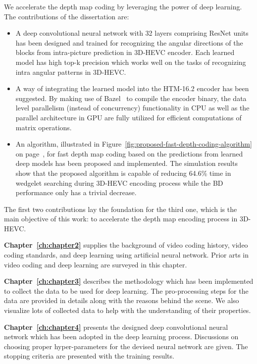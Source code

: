 We accelerate the depth map coding by leveraging the power of
deep learning.
The contributions of the dissertation are:
\begin{itemize}
  \item A deep convolutional neural network with 32 layers comprising ResNet
  units~\parencite{RN67} has been designed and trained for recognizing the
  angular directions of the blocks from intra-picture prediction in 3D-HEVC
  encoder.
  Each learned model has high top-k precision which works well on the
  tasks of recognizing intra angular patterns in 3D-HEVC\@.
  \item A way of integrating the learned model into the HTM-16.2 encoder has
  been suggested.
  By making use of Bazel~\parencite{RN200} to compile the encoder binary, the
  data level parallelism (instead of concurrency) functionality in CPU
  as well as the parallel architecture in GPU are fully utilized for
  efficient computations of matrix operations.
  \item An algorithm, illustrated in
  Figure~\ref{fig:proposed-fast-depth-coding-algorithm}
  on page~\pageref{fig:proposed-fast-depth-coding-algorithm}, for fast
  depth map coding based
  on the predictions from
  learned deep models has been proposed and implemented.
  The simulation results show that the proposed algorithm is capable of
  reducing 64.6\% time in wedgelet searching during 3D-HEVC encoding process
  while the BD performance only has a trivial decrease.
\end{itemize}
The first two contributions lay the foundation for the third one, which is the
main objective of this work: to accelerate the depth map encoding process in
3D-HEVC\@.

\textbf{Chapter~\ref{ch:chapter2}} supplies the background of video
coding history, video coding standards, and deep learning using artificial
neural network.
Prior arts in video coding and deep learning are surveyed in this chapter.

\textbf{Chapter~\ref{ch:chapter3}} describes the methodology which has been
implemented to collect the data to be used for deep learning.
The pro-processing steps for the data are provided in details along with
the reasons behind the scene.
We also visualize lots of collected data to help with the understanding of
their properties.

\textbf{Chapter~\ref{ch:chapter4}} presents the designed deep convolutional
neural network which has been adopted in the deep learning process.
Discussions on choosing proper hyper-parameters for the devised neural network
are given.
The stopping criteria are presented with the training results.

